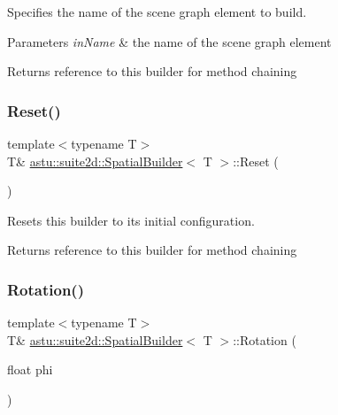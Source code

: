 Specifies the name of the scene graph element to build.


\begin{DoxyParams}{Parameters}
{\em in\+Name} & the name of the scene graph element \\
\hline
\end{DoxyParams}
\begin{DoxyReturn}{Returns}
reference to this builder for method chaining 
\end{DoxyReturn}
\mbox{\label{classastu_1_1suite2d_1_1SpatialBuilder_a3a9b7716087f96e4d621c2472123c497}} 
\subsubsection{\texorpdfstring{Reset()}{Reset()}}
{\footnotesize\ttfamily template$<$typename T$>$ \\
T\& \hyperlink{classastu_1_1suite2d_1_1SpatialBuilder}{astu\+::suite2d\+::\+Spatial\+Builder}$<$ T $>$\+::Reset (\begin{DoxyParamCaption}{ }\end{DoxyParamCaption})\hspace{0.3cm}{\ttfamily [inline]}}

Resets this builder to its initial configuration.

\begin{DoxyReturn}{Returns}
reference to this builder for method chaining 
\end{DoxyReturn}
\mbox{\label{classastu_1_1suite2d_1_1SpatialBuilder_addc0ef5adbf83cfeba15f9d66613315a}} 
\subsubsection{\texorpdfstring{Rotation()}{Rotation()}}
{\footnotesize\ttfamily template$<$typename T$>$ \\
T\& \hyperlink{classastu_1_1suite2d_1_1SpatialBuilder}{astu\+::suite2d\+::\+Spatial\+Builder}$<$ T $>$\+::Rotation (\begin{DoxyParamCaption}\item[{float}]{phi }\end{DoxyParamCaption})\hspace{0.3cm}{\ttfamily [inline]}}

